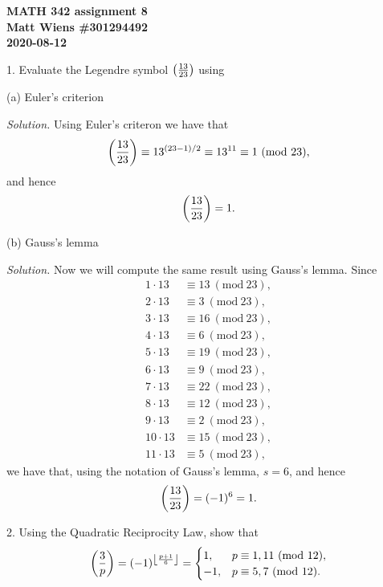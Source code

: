 \documentclass{article}
\newcommand{\Mod}[1]{\ (\mathrm{mod}\ #1)}
\newcommand{\Leg}[2]{\del{\frac{#1}{#2}}}
\DeclarePairedDelimiter\floor{\lfloor}{\rfloor}
\begin{document}
\textbf{MATH 342 assignment 8} \\
\textbf{Matt Wiens \#301294492} \\
\textbf{2020-08-12}

1. Evaluate the Legendre symbol $\Leg{13}{23}$ using

(a) Euler's criterion

\textit{Solution.}
Using Euler's criteron we have that
%
\begin{equation*}
    \Leg{13}{23}
    \equiv 13^{(23 - 1) / 2}
    \equiv 13^{11}
    \equiv 1
    \Mod{23}
    ,
\end{equation*}
%
and hence
%
\begin{equation*}
    \Leg{13}{23}
    = 1
    .
\end{equation*}

\vspace{5mm}

(b) Gauss's lemma

\textit{Solution.}
Now we will compute the same result using Gauss's lemma.
Since
%
\begin{align*}
    1 \cdot 13 &\equiv 13 \Mod{23}, \\
    2 \cdot 13 &\equiv 3 \Mod{23}, \\
    3 \cdot 13 &\equiv 16 \Mod{23}, \\
    4 \cdot 13 &\equiv 6 \Mod{23}, \\
    5 \cdot 13 &\equiv 19 \Mod{23}, \\
    6 \cdot 13 &\equiv 9 \Mod{23}, \\
    7 \cdot 13 &\equiv 22 \Mod{23}, \\
    8 \cdot 13 &\equiv 12 \Mod{23}, \\
    9 \cdot 13 &\equiv 2 \Mod{23}, \\
    10 \cdot 13 &\equiv 15 \Mod{23}, \\
    11 \cdot 13 &\equiv 5 \Mod{23},
\end{align*}
%
we have that, using the notation of Gauss's lemma, $s = 6$,
and hence
%
\begin{equation*}
    \Leg{13}{23}
    = (-1)^{6}
    = 1
    .
\end{equation*}

\newpage

2. Using the Quadratic Reciprocity Law, show that
%
\begin{equation*}
    \Leg{3}{p}
    = (-1)^{\floor*{\frac{p + 1}{6}}}
    =
    \begin{cases}
        1, & p \equiv 1, 11 \Mod{12}, \\
        -1, & p \equiv 5, 7 \Mod{12}.
    \end{cases}
\end{equation*}
\end{document}
